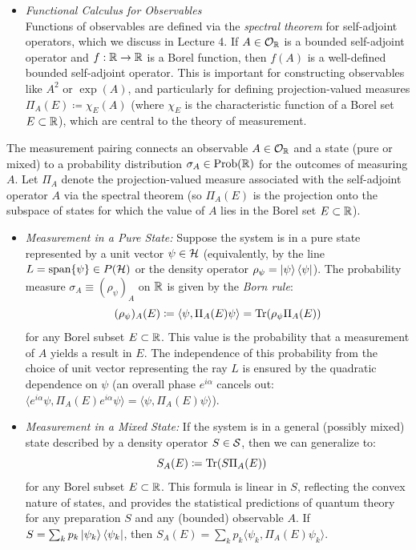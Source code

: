\begin{itemize}
\item \textit{Functional Calculus for Observables}\\
Functions of observables are defined via the \textit{spectral theorem} for self-adjoint operators, which we discuss in Lecture 4. If $A \in \mathcal{O}_{\mathbb{R}}$ is a bounded self-adjoint operator and $f: \mathbb{R} \to \mathbb{R}$ is a Borel function, then $f(A)$ is a well-defined bounded self-adjoint operator. This is important for constructing observables like $A^2$ or $\exp(A)$, and particularly for defining projection-valued measures $\Pi_A(E) \coloneqq \chi_E(A)$ (where $\chi_E$ is the characteristic function of a Borel set $E \subset \mathbb{R}$), which are central to the theory of measurement.
\end{itemize}

The measurement pairing connects an observable $A \in \mathcal{O}_{\mathbb{R}}$ and a state (pure or mixed) to a probability distribution $\sigma_A \in \text{Prob}(\mathbb{R})$ for the outcomes of measuring $A$. Let $\Pi_A$ denote the projection-valued measure associated with the self-adjoint operator $A$ via the spectral theorem (so $\Pi_A(E)$ is the projection onto the subspace of states for which the value of $A$ lies in the Borel set $E \subset \mathbb{R}$).

\begin{itemize}
\item \textit{Measurement in a Pure State:}
Suppose the system is in a pure state represented by a unit vector $\psi \in \mathcal{H}$ (equivalently, by the line $L = \text{span}\{\psi\} \in P(\mathcal{H})$ or the density operator $\rho_\psi = \ket{\psi}\bra{\psi}$). The probability measure $\sigma_A \equiv (\rho_\psi)_A$ on $\mathbb{R}$ is given by the \textit{Born rule}:
\[ (\rho_\psi)_A(E) \coloneqq \langle\psi, \Pi_A(E)\psi\rangle = \Tr(\rho_\psi \Pi_A(E))\]
for any Borel subset $E \subset \mathbb{R}$. This value is the probability that a measurement of $A$ yields a result in $E$. The independence of this probability from the choice of unit vector representing the ray $L$ is ensured by the quadratic dependence on $\psi$ (an overall phase $e^{i\alpha}$ cancels out: $\langle e^{i\alpha}\psi, \Pi_A(E)e^{i\alpha}\psi\rangle = \langle\psi, \Pi_A(E)\psi\rangle$).

\item \textit{Measurement in a Mixed State:}
If the system is in a general (possibly mixed) state described by a density operator $S \in \mathcal{S}$, then we can generalize to:
\[ S_A(E) \coloneqq \Tr(S \Pi_A(E)) \quad \]
for any Borel subset $E \subset \mathbb{R}$. This formula is linear in $S$, reflecting the convex nature of states, and provides the statistical predictions of quantum theory for any preparation $S$ and any (bounded) observable $A$. If $S = \sum_k p_k \ket{\psi_k}\bra{\psi_k}$, then $S_A(E) = \sum_k p_k \langle\psi_k, \Pi_A(E)\psi_k\rangle$.
\end{itemize}

